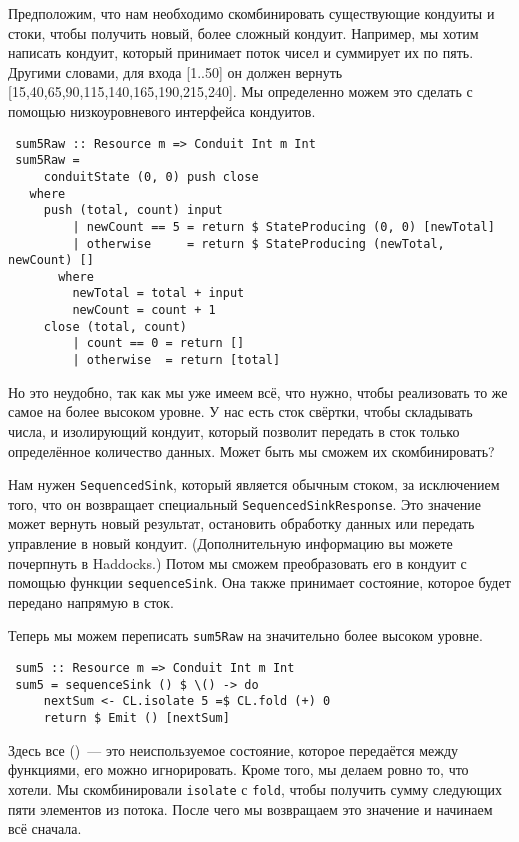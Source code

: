 Предположим, что нам необходимо скомбинировать существующие кондуиты  и  стоки,
чтобы получить новый, более сложный кондуит. Например, мы хотим написать кондуит,
который принимает поток чисел и суммирует их по пять. Другими словами, для входа
[1..50] он должен вернуть [15,40,65,90,115,140,165,190,215,240]. Мы определенно
можем это сделать с помощью низкоуровневого интерфейса кондуитов.
\begin{lstlisting}
 sum5Raw :: Resource m => Conduit Int m Int
 sum5Raw =
     conduitState (0, 0) push close
   where
     push (total, count) input
         | newCount == 5 = return $ StateProducing (0, 0) [newTotal]
         | otherwise     = return $ StateProducing (newTotal, newCount) []
       where
         newTotal = total + input
         newCount = count + 1
     close (total, count)
         | count == 0 = return []
         | otherwise  = return [total]
\end{lstlisting}
Но это неудобно, так как мы уже имеем всё, что нужно, чтобы реализовать то же самое
на более высоком уровне. У нас есть сток свёртки, чтобы складывать числа, и изолирующий
кондуит, который позволит передать в сток только определённое количество данных.
Может быть мы сможем их скомбинировать?

Нам нужен \lstinline'SequencedSink', который является обычным стоком, за исключением
того, что он возвращает специальный \lstinline'SequencedSinkResponse'. Это
значение может вернуть новый результат, остановить обработку данных или передать
управление в новый кондуит. (Дополнительную информацию вы можете почерпнуть
в Haddocks.) Потом мы сможем преобразовать его в кондуит с помощью функции
\lstinline'sequenceSink'. Она также принимает состояние, которое будет
передано напрямую в сток.

Теперь мы можем переписать \lstinline'sum5Raw' на значительно более высоком уровне.
\begin{lstlisting}
 sum5 :: Resource m => Conduit Int m Int
 sum5 = sequenceSink () $ \() -> do
     nextSum <- CL.isolate 5 =$ CL.fold (+) 0
     return $ Emit () [nextSum]
\end{lstlisting}
Здесь все ()~--- это  неиспользуемое состояние, которое передаётся между функциями,
его можно игнорировать.
Кроме того, мы делаем ровно то, что хотели. Мы скомбинировали
\lstinline{isolate} с \lstinline{fold}, чтобы получить сумму следующих пяти
элементов из потока. После чего мы возвращаем это значение и начинаем всё сначала.

